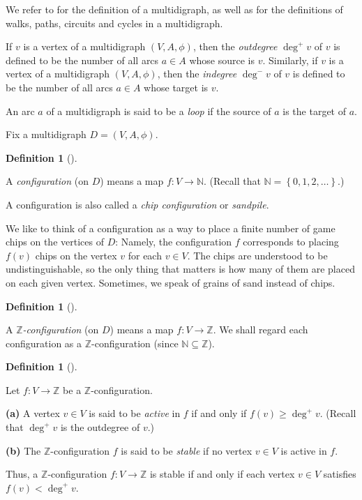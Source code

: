 \documentclass[numbers=enddot,12pt,final,onecolumn,notitlepage]{scrartcl}%
\theoremstyle{definition}
\newtheorem{defi}[theo]{Definition}
\newenvironment{definition}[1][]
{\begin{defi}[#1]\begin{leftbar}}
{\end{leftbar}\end{defi}}
\newcommand{\NN}{\mathbb{N}}
\newcommand{\ZZ}{\mathbb{Z}}
\newcommand{\set}[1]{\left\{ #1 \right\}}
\newcommand{\tup}[1]{\left( #1 \right)}
\begin{document}
We refer to \cite{hw2s} for the definition of a multidigraph, as well
as for the definitions of walks, paths, circuits and cycles in a
multidigraph.

If $v$ is a vertex of a multidigraph $\tup{V, A, \phi}$, then the
\textit{outdegree} $\deg^+ v$ of $v$ is defined to be the number
of all arcs $a \in A$ whose source is $v$.
Similarly,
if $v$ is a vertex of a multidigraph $\tup{V, A, \phi}$, then the
\textit{indegree} $\deg^- v$ of $v$ is defined to be the number
of all arcs $a \in A$ whose target is $v$.

An arc $a$ of a multidigraph is said to be a \textit{loop}
if the source of $a$ is the target of $a$.

Fix a multidigraph $D = \tup{V, A, \phi}$.

\begin{definition}
A \textit{configuration} (on $D$) means a map $f : V \to \NN$.
(Recall that $\NN = \set{0, 1, 2, \ldots}$.)

A configuration is also called a \textit{chip configuration} or
\textit{sandpile}.

We like to think of a configuration as a way to place
a finite number of game chips on the vertices of $D$:
Namely, the configuration $f$ corresponds to placing
$f \tup{v}$ chips on the vertex $v$ for each $v \in V$.
The chips are understood to be undistinguishable, so the
only thing that matters is how many of them are placed on
each given vertex.
Sometimes, we speak of grains of sand instead of chips.
\end{definition}

\begin{definition}
A \textit{$\ZZ$-configuration} (on $D$) means a map
$f : V \to \ZZ$.
We shall regard each configuration as a $\ZZ$-configuration
(since $\NN \subseteq \ZZ$).
\end{definition}

\begin{definition}
Let $f : V \to \ZZ$ be a $\ZZ$-configuration.

\textbf{(a)} A vertex $v \in V$ is said to be
\textit{active} in $f$ if and only if
$f\tup{v} \geq \deg^+ v$.
(Recall that $\deg^+ v$ is the outdegree of $v$.)

\textbf{(b)} The $\ZZ$-configuration $f$ is said to be
\textit{stable} if no vertex $v \in V$ is active in $f$.
\end{definition}

Thus, a $\ZZ$-configuration $f : V \to \ZZ$ is stable
if and only if each vertex $v \in V$ satisfies
$f \tup{v} < \deg^+ v$.
\end{document}
